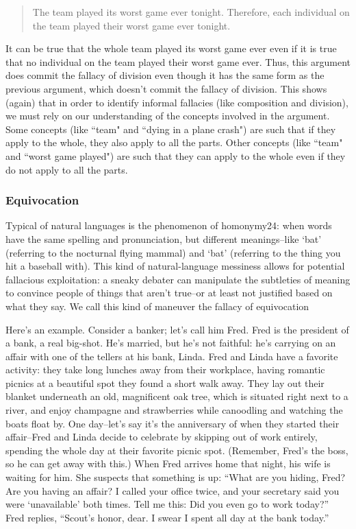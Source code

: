 \begin{quote}        The team played its worst game ever tonight. Therefore, each individual
        on the team played their worst game ever tonight.\end{quote}

It can be true that the whole team played its worst game ever even if it is true
that no individual on the team played their worst game ever. Thus, this
argument does commit the fallacy of division even though it has the same form
as the previous argument, which doesn't commit the fallacy of division. This
shows (again) that in order to identify informal fallacies (like composition and
division), we must rely on our understanding of the concepts involved in the
argument. Some concepts (like ``team" and ``dying in a plane crash") are such
that if they apply to the whole, they also apply to all the parts. Other concepts
(like ``team" and ``worst game played") are such that they can apply to the
whole even if they do not apply to all the parts.

\subsubsection{Equivocation}
Typical of natural languages is the phenomenon of homonymy24: when words have the same
spelling and pronunciation, but different meanings--like `bat' (referring to the nocturnal flying
mammal) and `bat' (referring to the thing you hit a baseball with). This kind of natural-language
messiness allows for potential fallacious exploitation: a sneaky debater can manipulate the
subtleties of meaning to convince people of things that aren't true--or at least not justified based
on what they say. We call this kind of maneuver the fallacy of equivocation

Here's an example. Consider a banker; let's call him Fred. Fred is the president of a bank, a real
big-shot. He's married, but he's not faithful: he's carrying on an affair with one of the tellers at his
bank, Linda. Fred and Linda have a favorite activity: they take long lunches away from their
workplace, having romantic picnics at a beautiful spot they found a short walk away. They lay out
their blanket underneath an old, magnificent oak tree, which is situated right next to a river, and
enjoy champagne and strawberries while canoodling and watching the boats float by.
One day--let's say it's the anniversary of when they started their affair--Fred and Linda decide
to celebrate by skipping out of work entirely, spending the whole day at their favorite picnic spot.
(Remember, Fred's the boss, so he can get away with this.) When Fred arrives home that night,
his wife is waiting for him. She suspects that something is up: ``What are you hiding, Fred? Are
you having an affair? I called your office twice, and your secretary said you were `unavailable'
both times. Tell me this: Did you even go to work today?'' Fred replies, ``Scout's honor, dear. I
swear I spent all day at the bank today.''

